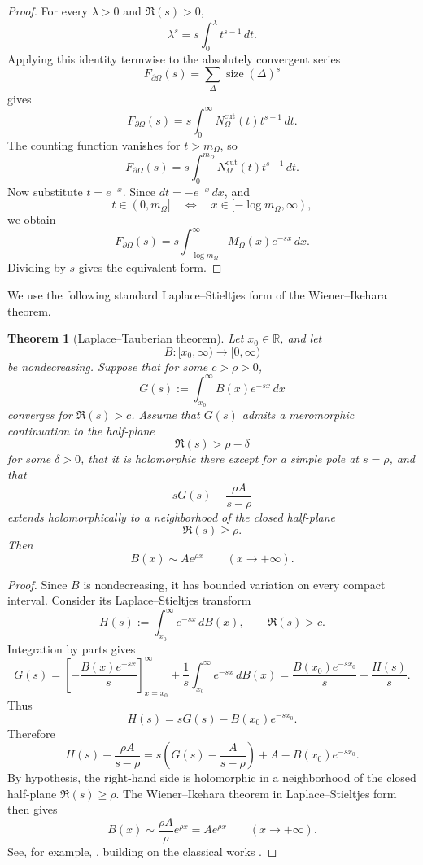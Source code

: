 \documentclass[a4paper,american,11pt]{amsart}
\theoremstyle{plain}
\newtheorem{theorem}{Theorem}[section]
\theoremstyle{definition}
\newcommand{\R}{\mathbb R}
\begin{document}
\begin{proof}
For every \(\lambda>0\) and \(\Re(s)>0\),
\[
\lambda^s=s\int_0^\lambda t^{s-1}\,dt.
\]
Applying this identity termwise to the absolutely convergent series
\[
F_{\partial\Omega}(s)
=
\sum_\Delta \operatorname{size}(\Delta)^s
\]
gives
\[
F_{\partial\Omega}(s)
=
s\int_0^\infty N^{\mathrm{cut}}_\Omega(t)t^{s-1}\,dt.
\]
The counting function vanishes for \(t>m_\Omega\), so
\[
F_{\partial\Omega}(s)
=
s\int_0^{m_\Omega} N^{\mathrm{cut}}_\Omega(t)t^{s-1}\,dt.
\]
Now substitute \(t=e^{-x}\).  Since \(dt=-e^{-x}\,dx\), and
\[
t\in(0,m_\Omega]
\quad\Longleftrightarrow\quad
x\in[-\log m_\Omega,\infty),
\]
we obtain
\[
F_{\partial\Omega}(s)
=
s\int_{-\log m_\Omega}^{\infty}M_\Omega(x)e^{-sx}\,dx.
\]
Dividing by \(s\) gives the equivalent form.
\end{proof}

We use the following standard Laplace--Stieltjes form of the
Wiener--Ikehara theorem.

\begin{theorem}[Laplace--Tauberian theorem]
\label{thm:laplace-tauberian}
Let \(x_0\in\R\), and let
\[
B:[x_0,\infty)\to[0,\infty)
\]
be nondecreasing.  Suppose that for some \(c>\rho>0\),
\[
G(s):=\int_{x_0}^{\infty} B(x)e^{-sx}\,dx
\]
converges for \(\Re(s)>c\).  Assume that \(G(s)\) admits a meromorphic
continuation to the half-plane
\[
\Re(s)>\rho-\delta
\]
for some \(\delta>0\), that it is holomorphic there except for a simple pole
at \(s=\rho\), and that
\[
sG(s)-\frac{\rho A}{s-\rho}
\]
extends holomorphically to a neighborhood of the closed half-plane
\[
\Re(s)\ge \rho.
\]
Then
\[
B(x)\sim A e^{\rho x}
\qquad (x\to+\infty).
\]
\end{theorem}

\begin{proof}
Since \(B\) is nondecreasing, it has bounded variation on every compact
interval.  Consider its Laplace--Stieltjes transform
\[
H(s):=\int_{x_0}^{\infty}e^{-sx}\,dB(x),
\qquad \Re(s)>c.
\]
Integration by parts gives
\[
G(s)
=
\left[-\frac{B(x)e^{-sx}}{s}\right]_{x=x_0}^{\infty}
+
\frac1s\int_{x_0}^{\infty}e^{-sx}\,dB(x)
=
\frac{B(x_0)e^{-sx_0}}{s}+\frac{H(s)}{s}.
\]
Thus
\[
H(s)=sG(s)-B(x_0)e^{-sx_0}.
\]
Therefore
\[
H(s)-\frac{\rho A}{s-\rho}
=
s\left(G(s)-\frac{A}{s-\rho}\right)
+
A-B(x_0)e^{-sx_0}.
\]
By hypothesis, the right-hand side is holomorphic in a neighborhood of the
closed half-plane \(\Re(s)\ge\rho\).  The Wiener--Ikehara theorem in Laplace--Stieltjes form
then gives
\[
B(x)\sim \frac{\rho A}{\rho}e^{\rho x}=A e^{\rho x}
\qquad (x\to+\infty).
\]
See, for example, \cite[Chapter~III]{Korevaar2004}, building on the classical
works \cite{Ikehara1931,Wiener1932}.
\end{proof}
\end{document}
